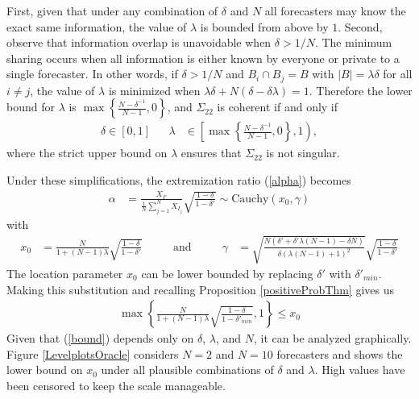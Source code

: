 \documentclass[11pt]{article}
\theoremstyle{definition}
\theoremstyle{definition}
\begin{document}
First, given that under any combination of $\delta$ and $N$ all
forecasters may know the exact same information, the value of
$\lambda$ is bounded from above by $1$. Second, observe that
information overlap is unavoidable when $\delta > 1/N$.  The minimum
sharing occurs when all information is either known by everyone or
private to a single forecaster.  In other words, if $\delta > 1/N$ and
$B_{i} \cap B_j = B$ with $|B| = \lambda \delta$ for all $i \neq j$,
the value of $\lambda$ is minimized when $\lambda\delta + N(\delta -
\delta\lambda) = 1$.  Therefore the lower bound for $\lambda$ is $\max
\left\{ \frac{N-\delta^{-1}}{N-1}, 0\right\}$, and $\Sigma_{22}$ is
coherent if and only if
\begin{align}
\delta \in [0,1] &&  \lambda &\in \left[  
   \max \left\{ \frac{N-\delta^{-1}}{N-1}, 0\right\}, 1 \right), 
   \label{rhoDomain}
\end{align}
where the strict upper bound on $\lambda$ ensures that
$\Sigma_{22}$ is not singular.  

Under these simplifications, the extremization ratio (\ref{alpha})
becomes
\begin{align*}
\alpha &= \frac{X_{I'}}{\frac{1}{N}\sum_{j=1}^N X_{I_j}} \sqrt{\frac{1-\delta}{1-\delta'}} \sim \text{Cauchy}(x_0, \gamma)
\end{align*}
 with
\begin{align*}
x_0 &= \frac{N}{1+(N-1)\lambda}  \sqrt{\frac{1-\delta}{1-\delta'}} &&& \text{ and } &&& \gamma &=  \sqrt{\frac{N(\delta' + \delta' \lambda (N-1) - \delta N)}{\delta (\lambda (N-1) + 1)^2}}\sqrt{\frac{1-\delta}{1-\delta'}}
\end{align*}
The location parameter $x_0$ can be lower bounded by replacing
$\delta'$ with $\delta'_{min}$. Making this substitution and recalling
Proposition \ref{positiveProbThm} gives us
\begin{align}
\max\left\{ \frac{N}{1+(N-1)\lambda}  \sqrt{\frac{1-\delta}{1-\delta'_{min}}}, 1 \right\} \leq x_0 \label{bound}
\end{align}
Given that (\ref{bound}) depends only on $\delta$, $\lambda$, and $N$, it can be analyzed graphically. Figure \ref{LevelplotsOracle} considers $N=2$ and $N = 10$ forecasters and shows the lower bound on $x_0$ under all plausible combinations of $\delta$ and $\lambda$. High values have been censored to keep the scale manageable. 
\end{document}
